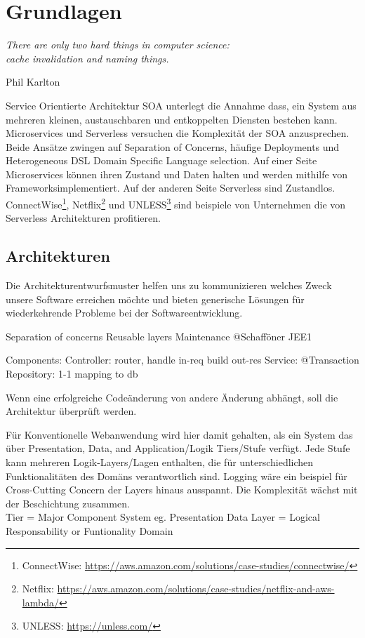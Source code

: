 \documentclass[
12pt,
english,
ngerman,
headsepline,
twoside,
openright,
numbers=noenddot,version=first
]{scrreprt}
\begin{document}
\chapter{Grundlagen}
\label{chap:principles}
\label{chap:introduction}
\epigraph{\textit{\textquotedbl{}
		There are only two hard things in computer science:\\ cache invalidation and naming things.\textquotedbl{}}}{ Phil Karlton }

Service Orientierte Architektur SOA unterlegt die Annahme dass, ein System aus mehreren kleinen, austauschbaren und entkoppelten Diensten bestehen kann. Microservices und Serverless versuchen die Komplexität der SOA anzusprechen. Beide Ansätze zwingen auf Separation of Concerns, häufige Deployments und Heterogeneous DSL Domain Specific Language selection. 
Auf einer Seite Microservices können ihren Zustand und Daten halten und werden mithilfe von \glqq Frameworks\grqq implementiert. Auf der anderen Seite Serverless sind Zustandlos.
ConnectWise\footnote{ConnectWise: \url{https://aws.amazon.com/solutions/case-studies/connectwise/}}, Netflix\footnote{Netflix: \url{https://aws.amazon.com/solutions/case-studies/netflix-and-aws-lambda/}} und UNLESS\footnote{UNLESS: \url{https://unless.com/}} sind beispiele von Unternehmen die von Serverless Architekturen profitieren.

\section{Architekturen} 

Die Architekturentwurfsmuster helfen uns zu kommunizieren welches Zweck unsere Software erreichen möchte und bieten generische Lösungen für wiederkehrende Probleme bei der Softwareentwicklung.

Separation of concerns
Reusable layers
Maintenance @Schafföner JEE1

Components: 
Controller: router, handle in-req build out-res
Service: @Transaction
Repository: 1-1 mapping to db

Wenn eine erfolgreiche Codeänderung von andere Änderung abhängt, soll die Architektur überprüft werden. 



Für Konventionelle Webanwendung wird hier damit gehalten, als ein System das über Presentation, Data, and Application/Logik Tiers/Stufe verfügt. Jede Stufe kann mehreren Logik-Layers/Lagen enthalten, die für unterschiedlichen Funktionalitäten des Domäns verantwortlich sind. Logging wäre ein beispiel für Cross-Cutting Concern der Layers hinaus ausspannt. Die Komplexität wächst mit der Beschichtung zusammen.\\
Tier = Major Component System eg. Presentation Data
Layer = Logical Responsability or Funtionality Domain
 
\end{document}
